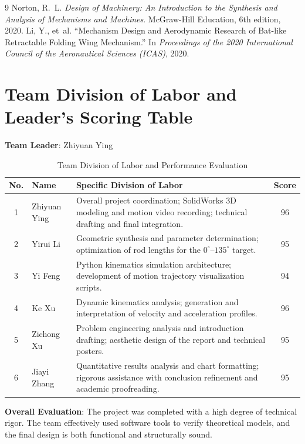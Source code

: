 \documentclass[11pt,a4paper]{article}
\begin{document}
\clearpage


\begin{thebibliography}{9}
 Norton, R.~L. \emph{Design of Machinery: An Introduction to the Synthesis and Analysis of Mechanisms and Machines}. McGraw-Hill Education, 6th edition, 2020.
 Li, Y., et~al. ``Mechanism Design and Aerodynamic Research of Bat-like Retractable Folding Wing Mechanism.'' In \emph{Proceedings of the 2020 International Council of the Aeronautical Sciences (ICAS)}, 2020.
\end{thebibliography}

\clearpage

\appendix
\section{Team Division of Labor and Leader's Scoring Table}

\textbf{Team Leader}: Zhiyuan Ying

\begin{table}[htbp]
    \centering
    \renewcommand{\arraystretch}{1.5}
    \caption{Team Division of Labor and Performance Evaluation}
    \vspace{0.3cm}
    \begin{tabularx}{\textwidth}{c l X c}
        \toprule
        \textbf{No.} & \textbf{Name} & \textbf{Specific Division of Labor} & \textbf{Score} \\
        \midrule
        1 & Zhiyuan Ying & Overall project coordination; SolidWorks 3D modeling and motion video recording; technical drafting and final integration. & 96 \\
        2 & Yirui Li & Geometric synthesis and parameter determination; optimization of rod lengths for the $0^\circ$--$135^\circ$ target. & 95 \\
        3 & Yi Feng & Python kinematics simulation architecture; development of motion trajectory visualization scripts. & 94 \\
        4 & Ke Xu & Dynamic kinematics analysis; generation and interpretation of velocity and acceleration profiles. & 96 \\
        5 & Zichong Xu & Problem engineering analysis and introduction drafting; aesthetic design of the report and technical posters. & 95 \\
        6 & Jiayi Zhang & Quantitative results analysis and chart formatting; rigorous assistance with conclusion refinement and academic proofreading. & 95 \\
        \bottomrule
    \end{tabularx}
\end{table}

\textbf{Overall Evaluation}: The project was completed with a high degree of technical rigor. The team effectively used software tools to verify theoretical models, and the final design is both functional and structurally sound.
\end{document}

